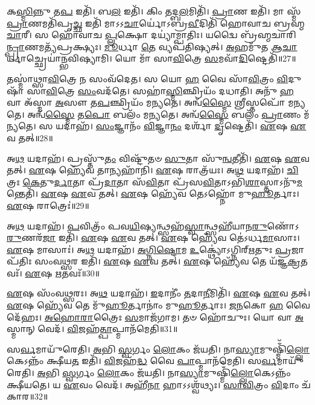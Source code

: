    𑌕\-\ul{𑌸𑍍𑌮𑌿}\-𑌨𑍍𑌨𑍁 𑌤\-\ul{𑌪} 𑌇𑌤𑌿᳴।
   𑌬\-\ul{𑌲} 𑌇𑌤𑌿᳴।
   𑌕𑌿𑌂 𑌤𑌦𑍍𑌬\-\ul{𑌲}\-𑌮𑌿𑌤𑌿᳴।
   \ul{𑌪𑍍𑌰𑌾}\-𑌣 𑌇𑌤𑌿᳴।
   𑌮𑌾 𑌸𑍍𑌮᳴ \ul{𑌪𑍍𑌰𑌾}\-𑌣𑌮𑌤𑌿᳴𑌪𑍃\-\ul{𑌚𑍍𑌛} 𑌇𑌤𑌿᳴ 𑌮𑌾𑌽𑌽\-\ul{𑌚𑌾}\-𑌰𑍍𑌯𑍋॑𑌽𑌬𑍍𑌰\-\ul{𑌵𑍀}\-𑌦𑌿𑌤𑌿᳴ 𑌹𑍋𑌵𑌾𑌚 𑌬𑍍𑌰𑌹𑍍𑌮\-\ul{𑌚𑌾}\-𑌰𑍀।
   𑌸 𑌹𑍋᳴𑌵𑌾𑌚 \ul{𑌪𑍍𑌲}\-𑌕𑍍𑌷𑍋 𑌦𑌯𑍍𑌯𑌾॑𑌮𑍍𑌪𑌾𑌤𑌿𑌃।
   𑌯𑌦𑍍𑌵𑍈 𑌬𑍍𑌰᳴𑌹𑍍𑌮𑌚𑌾𑌰𑌿\-\ul{𑌨𑍍𑌪𑍍𑌰𑌾}\-𑌣𑌮𑌤𑍍𑌯᳴𑌪𑍍𑌰𑌕𑍍𑌷𑍍𑌯𑌃।
   \ul{𑌮𑍂}\-𑌰𑍍𑌧𑌾 \ul{𑌤𑍇} 𑌵𑍍𑌯𑌪᳴𑌤𑌿𑌷𑍍𑌯𑌤𑍍।
   \ul{𑌅}\-𑌹𑌮𑍁᳴𑌤 𑌆\-\ul{𑌚𑌾}\-𑌰𑍍𑌯𑌾𑌚𑍍𑌛𑍍𑌰𑍇𑌯𑌾॑𑌨𑍍𑌭𑌵𑌿𑌷𑍍𑌯𑌾𑌮𑌿।
   𑌯𑍋 𑌮𑌾᳴ 𑌸𑌾\-\ul{𑌵𑌿}\-𑌤𑍍𑌰𑍇 \ul{𑌸}\-𑌮𑌵𑌾᳴\-\ul{𑌦𑌿}\-𑌷𑍍𑌟𑍇𑌤𑌿᳴॥27॥

   𑌤𑌸𑍍𑌮𑌾॑𑌥𑍍𑌸𑌾\-\ul{𑌵𑌿}\-𑌤𑍍𑌰𑍇 𑌨 𑌸𑌂𑌵᳴𑌦𑍇𑌤।
   𑌸 𑌯𑍋 \ul{𑌹} 𑌵𑍈 𑌸𑌾᳴\-\ul{𑌵𑌿}\-𑌤𑍍𑌰𑌂 \ul{𑌵𑌿}\-𑌦𑍁𑌷𑌾᳴ 𑌸𑌾\-\ul{𑌵𑌿}\-𑌤𑍍𑌰𑍇 \ul{𑌸𑌂}\-𑌵𑌦᳴𑌤𑍇।
   𑌸𑌹𑌾॑\-\ul{𑌸𑍍𑌮𑌿}\-𑌞𑍍𑌛𑍍𑌰𑌿𑌯𑌂᳴ 𑌦𑌧𑌾𑌤𑌿।
   𑌅𑌨𑍁᳴ \ul{𑌹} 𑌵𑌾 𑌅᳴𑌸𑍍𑌮𑌾 \ul{𑌅}\-𑌸𑍗 𑌤\-\ul{𑌪}\-𑌞𑍍𑌛𑍍𑌰𑌿𑌯𑌂᳴ 𑌮𑌨𑍍𑌯𑌤𑍇।
   𑌅𑌨𑍍𑌵᳴\-\ul{𑌸𑍍𑌮𑍈} 𑌶𑍍𑌰𑍀𑌸𑍍𑌤𑌪𑍋᳴ 𑌮𑌨𑍍𑌯𑌤𑍇।
   𑌅𑌨𑍍𑌵᳴\-\ul{𑌸𑍍𑌮𑍈} 𑌤\-\ul{𑌪𑍋} 𑌬𑌲𑌂᳴ 𑌮𑌨𑍍𑌯𑌤𑍇।
   𑌅𑌨𑍍𑌵᳴\-\ul{𑌸𑍍𑌮𑍈} 𑌬𑌲𑌂᳴ \ul{𑌪𑍍𑌰𑌾}\-𑌣𑌂 𑌮᳴𑌨𑍍𑌯𑌤𑍇।
   𑌸 𑌯𑌦𑌾𑌹᳴।
   \ul{𑌸𑌂}\-𑌜𑍍𑌞𑌾𑌨𑌂᳴ \ul{𑌵𑌿}\-𑌜𑍍𑌞𑌾\-\ul{𑌨𑌂} 𑌦𑌰𑍍\mbox{}𑌶𑌾᳴ \ul{𑌦𑍃}\-𑌷𑍍𑌟𑍇𑌤𑌿᳴।
   \ul{𑌏}\-𑌷 \ul{𑌏}\-𑌵 𑌤𑌤𑍍॥28॥

   𑌅\-\ul{𑌥} 𑌯𑌦𑌾𑌹᳴।
   𑌪𑍍𑌰𑌸𑍍𑌤𑍁᳴\-\ul{𑌤𑌂} 𑌵𑌿𑌷𑍍𑌟𑍁᳴𑌤𑍞 \ul{𑌸𑍁}\-𑌤𑌾 𑌸𑍁᳴\-\ul{𑌨𑍍𑌵}\-𑌤𑍀𑌤𑌿᳴।
   \ul{𑌏}\-𑌷 \ul{𑌏}\-𑌵 𑌤𑌤𑍍।
   \ul{𑌏}\-𑌷 𑌹𑍍𑌯𑍇᳴𑌵 𑌤𑌾𑌨𑍍𑌯𑌹𑌾᳴𑌨𑌿।
   \ul{𑌏}\-𑌷 𑌰𑌾𑌤𑍍𑌰᳴𑌯𑌃।
   𑌅\-\ul{𑌥} 𑌯𑌦𑌾𑌹᳴।
   \ul{𑌚𑌿}\-𑌤𑍍𑌰𑌃 \ul{𑌕𑍇}\-𑌤𑍁\-\ul{𑌰𑍍𑌦𑌾}\-𑌤𑌾 𑌪𑍍𑌰᳴\-\ul{𑌦𑌾}\-𑌤𑌾 𑌸᳴\-\ul{𑌵𑌿}\-𑌤𑌾 𑌪𑍍𑌰᳴𑌸\-\ul{𑌵𑌿}\-𑌤𑌾𑌽𑌭𑌿᳴\-\ul{𑌶𑌾}\-𑌸𑍍𑌤𑌾𑌽𑌨𑍁᳴\-\ul{𑌮}\-𑌨𑍍𑌤𑍇𑌤𑌿᳴।
   \ul{𑌏}\-𑌷 \ul{𑌏}\-𑌵 𑌤𑌤𑍍।
   \ul{𑌏}\-𑌷 𑌹𑍍𑌯𑍇᳴𑌵 𑌤𑍇𑌽𑌹𑍍𑌨𑍋᳴ 𑌮𑍁\-\ul{𑌹𑍂}\-𑌰𑍍𑌤𑌾𑌃।
   \ul{𑌏}\-𑌷 𑌰𑌾𑌤𑍍𑌰𑍇𑌃॑॥29॥

   𑌅\-\ul{𑌥} 𑌯𑌦𑌾𑌹᳴।
   \ul{𑌪}\-𑌵𑌿𑌤𑍍𑌰𑌂᳴ 𑌪𑌵\-\ul{𑌯𑌿}\-𑌷𑍍𑌯𑌨𑍍𑌥𑍍𑌸𑌹᳴\-\ul{𑌸𑍍𑌵𑌾}\-𑌨𑍍𑌥𑍍𑌸𑌹𑍀᳴𑌯𑌾𑌨\-\ul{𑌰𑍁}\-𑌣𑍋᳴\-𑌽\-\ul{𑌰𑍁}\-𑌣𑌰᳴\-\ul{𑌜𑌾} 𑌇𑌤𑌿᳴।
   \ul{𑌏}\-𑌷 \ul{𑌏}\-𑌵 𑌤𑌤𑍍।
   \ul{𑌏}\-𑌷 𑌹𑍍𑌯𑍇᳴𑌵 𑌤𑍇॑𑌽𑌰𑍍𑌧\-\ul{𑌮𑌾}\-𑌸𑌾𑌃।
   \ul{𑌏}\-𑌷 𑌮𑌾𑌸𑌾𑌃॑।
   𑌅\-\ul{𑌥} 𑌯𑌦𑌾𑌹᳴।
   \ul{𑌅}\-\-\ul{𑌗𑍍𑌨𑌿}\-\-\ul{𑌷𑍍𑌟𑍋}\-𑌮 \ul{𑌉}\-𑌕𑍍𑌥𑍍𑌯𑍋॑𑌽𑌗𑍍𑌨𑌿𑌰𑍍{‌}\-\ul{𑌋}\-𑌤𑍁𑌃 \ul{𑌪𑍍𑌰}\-𑌜𑌾𑌪᳴𑌤𑌿𑌃 𑌸𑌂𑌵\-\ul{𑌥𑍍𑌸}\-𑌰 𑌇𑌤𑌿᳴।
   \ul{𑌏}\-𑌷 \ul{𑌏}\-𑌵 𑌤𑌤𑍍।
   \ul{𑌏}\-𑌷 𑌹𑍍𑌯𑍇᳴𑌵 𑌤𑍇 𑌯᳴𑌜𑍍𑌞\-\ul{𑌕𑍍𑌰}\-𑌤𑌵𑌃᳴।
   \ul{𑌏}\-𑌷 \ul{𑌋}\-𑌤𑌵𑌃᳴॥30॥

   \ul{𑌏}\-𑌷 𑌸𑌂᳴𑌵\-\ul{𑌥𑍍𑌸}\-𑌰𑌃।
   𑌅\-\ul{𑌥} 𑌯𑌦𑌾𑌹᳴।
   \ul{𑌇}\-𑌦𑌾𑌨𑍀𑌂॑ \ul{𑌤}\-𑌦𑌾\-\ul{𑌨𑍀}\-𑌮𑌿𑌤𑌿᳴।
   \ul{𑌏}\-𑌷 \ul{𑌏}\-𑌵 𑌤𑌤𑍍।
   \ul{𑌏}\-𑌷 𑌹𑍍𑌯𑍇᳴𑌵 𑌤𑍇 𑌮𑍁᳴\-\ul{𑌹𑍂}\-𑌰𑍍𑌤𑌾𑌨𑌾𑌂॑ 𑌮𑍁\-\ul{𑌹𑍂}\-𑌰𑍍𑌤𑌾𑌃।
    \ul{𑌜}\-\-\ul{𑌨}\-𑌕𑍋 \ul{𑌹} 𑌵𑍈𑌦𑍇᳴𑌹𑌃।
   \ul{𑌅}\-\-\ul{𑌹𑍋}\-\-\ul{𑌰𑌾}\-𑌤𑍍𑌰𑍈𑌃 \ul{𑌸}\-𑌮𑌾𑌜᳴𑌗𑌾𑌮।
   𑌤𑍞 𑌹𑍋᳴𑌚𑍁𑌃।
   𑌯𑍋 𑌵𑌾 \ul{𑌅}\-𑌸𑍍𑌮𑌾𑌨𑍍 𑌵𑍇𑌦᳴।
   \ul{𑌵𑌿}\-𑌜𑌹᳴\-\ul{𑌤𑍍𑌪𑌾}\-𑌪𑍍𑌮𑌾𑌨᳴𑌮𑍇𑌤𑌿॥31॥

   𑌸\-\ul{𑌰𑍍𑌵}\-𑌮𑌾𑌯𑍁᳴𑌰𑍇𑌤𑌿।
   \ul{𑌅}\-𑌭𑌿 \ul{𑌸𑍍𑌵}\-𑌰𑍍𑌗𑌂 \ul{𑌲𑍋}\-𑌕𑌂 𑌜᳴𑌯𑌤𑌿।
   𑌨𑌾\-\ul{𑌸𑍍𑌯𑌾}\-𑌮𑍁𑌷𑍍𑌮𑌿𑌁᳴\-\ul{𑌲𑍍𑌲𑍋}\-𑌕𑍇\-𑌽𑌨𑍍𑌨𑌂᳴ 𑌕𑍍𑌷𑍀𑌯\-\ul{𑌤} 𑌇𑌤𑌿᳴।
   \ul{𑌵𑌿}\-𑌜𑌹᳴\-\ul{𑌦𑍍𑌧} 𑌵𑍈 \ul{𑌪𑌾}\-𑌪𑍍𑌮𑌾𑌨᳴𑌮𑍇𑌤𑌿।
   𑌸\-\ul{𑌰𑍍𑌵}\-𑌮𑌾𑌯𑍁᳴𑌰𑍇𑌤𑌿।
   \ul{𑌅}\-𑌭𑌿 \ul{𑌸𑍍𑌵}\-𑌰𑍍𑌗𑌂 \ul{𑌲𑍋}\-𑌕𑌂 𑌜᳴𑌯𑌤𑌿।
   𑌨𑌾\-\ul{𑌸𑍍𑌯𑌾}\-𑌮𑍁𑌷𑍍𑌮𑌿𑌁᳴\-\ul{𑌲𑍍𑌲𑍋}\-𑌕𑍇𑌽𑌨𑍍𑌨𑌂᳴ 𑌕𑍍𑌷𑍀𑌯𑌤𑍇।
   𑌯 \ul{𑌏}\-𑌵𑌂 𑌵𑍇𑌦᳴।
   𑌅𑌹𑍀᳴\-\ul{𑌨𑌾} 𑌹𑌾𑌽𑌽𑌶𑍍𑌵᳴𑌥𑍍𑌯𑌃।
   \ul{𑌸𑌾}\-\-\ul{𑌵𑌿}\-𑌤𑍍𑌰𑌂 \ul{𑌵𑌿}\-𑌦𑌾𑌂 𑌚᳴𑌕𑌾𑌰॥32॥


